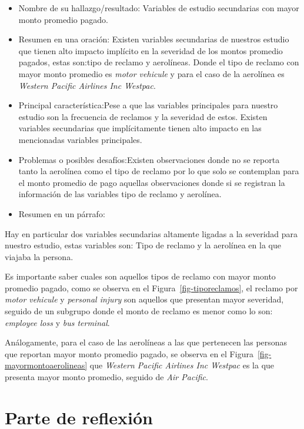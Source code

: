 \documentclass[
  letterpaper,
  onepage,
  openany]{scrreprt}
\begin{document}
\begin{itemize}
\item
  Nombre de su hallazgo/resultado: Variables de estudio secundarias con
  mayor monto promedio pagado.
\item
  Resumen en una oración: Existen variables secundarias de nuestros
  estudio que tienen alto impacto implícito en la severidad de los
  montos promedio pagados, estas son:tipo de reclamo y aerolíneas. Donde
  el tipo de reclamo con mayor monto promedio es \emph{motor vehicule} y
  para el caso de la aerolínea es \emph{Western Pacific Airlines Inc
  Westpac}.
\item
  Principal característica:Pese a que las variables principales para
  nuestro estudio son la frecuencia de reclamos y la severidad de estos.
  Existen variables secundarias que implícitamente tienen alto impacto
  en las mencionadas variables principales.
\item
  Problemas o posibles desafíos:Existen observaciones donde no se
  reporta tanto la aerolínea como el tipo de reclamo por lo que solo se
  contemplan para el monto promedio de pago aquellas observaciones donde
  si se registran la información de las variables tipo de reclamo y
  aerolínea.
\item
  Resumen en un párrafo:
\end{itemize}

Hay en particular dos variables secundarias altamente ligadas a la
severidad para nuestro estudio, estas variables son: Tipo de reclamo y
la aerolínea en la que viajaba la persona.

Es importante saber cuales son aquellos tipos de reclamo con mayor monto
promedio pagado, como se observa en el Figura~\ref{fig-tiporeclamos}, el
reclamo por \emph{motor vehicule} y \emph{personal injury} son aquellos
que presentan mayor severidad, seguido de un subgrupo donde el monto de
reclamo es menor como lo son: \emph{employee loss} y \emph{bus
terminal}.

Análogamente, para el caso de las aerolíneas a las que pertenecen las
personas que reportan mayor monto promedio pagado, se observa en el
Figura~\ref{fig-mayormontoaerolineas} que \emph{Western Pacific Airlines
Inc Westpac} es la que presenta mayor monto promedio, seguido de
\emph{Air Pacific}.

\hypertarget{parte-de-reflexiuxf3n}{%
\section{Parte de reflexión}\label{parte-de-reflexiuxf3n}}
\end{document}
